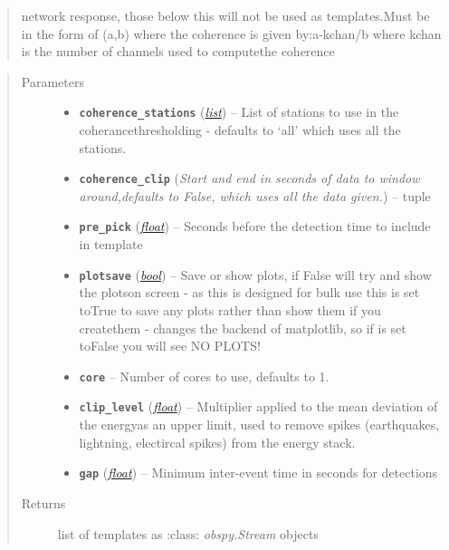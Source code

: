 \documentclass[a4paper,10pt,english]{sphinxmanual}
\begin{document}
\begin{fulllineitems}
\begin{quote}
network response, those below this will not be used as templates.Must be in the form of (a,b) where the coherence is given by:a-kchan/b where kchan is the number of channels used to computethe coherence
\end{quote}
\begin{quote}\begin{description}
\item[{Parameters}] \leavevmode\begin{itemize}
\item {} 
\textbf{\texttt{coherence\_stations}} (\href{https://docs.python.org/library/functions.html\#list}{\emph{list}}) -- List of stations to use in the coherancethresholding - defaults to `all' which uses all the stations.

\item {} 
\textbf{\texttt{coherence\_clip}} (\emph{Start and end in seconds of data to window around,defaults to False, which uses all the data given.}) -- tuple

\item {} 
\textbf{\texttt{pre\_pick}} (\href{https://docs.python.org/library/functions.html\#float}{\emph{float}}) -- Seconds before the detection time to include in template

\item {} 
\textbf{\texttt{plotsave}} (\href{https://docs.python.org/library/functions.html\#bool}{\emph{bool}}) -- Save or show plots, if False will try and show the plotson screen - as this is designed for bulk use this is set toTrue to save any plots rather than show them if you createthem - changes the backend of matplotlib, so if is set toFalse you will see NO PLOTS!

\item {} 
\textbf{\texttt{core}} -- Number of cores to use, defaults to 1.

\item {} 
\textbf{\texttt{clip\_level}} (\href{https://docs.python.org/library/functions.html\#float}{\emph{float}}) -- Multiplier applied to the mean deviation of the energyas an upper limit, used to remove spikes (earthquakes, lightning, electircal spikes) from the energy stack.

\item {} 
\textbf{\texttt{gap}} (\href{https://docs.python.org/library/functions.html\#float}{\emph{float}}) -- Minimum inter-event time in seconds for detections

\end{itemize}

\item[{Returns}] \leavevmode
list of templates as :class: \emph{obspy.Stream} objects

\end{description}\end{quote}

\end{fulllineitems}
\end{document}
